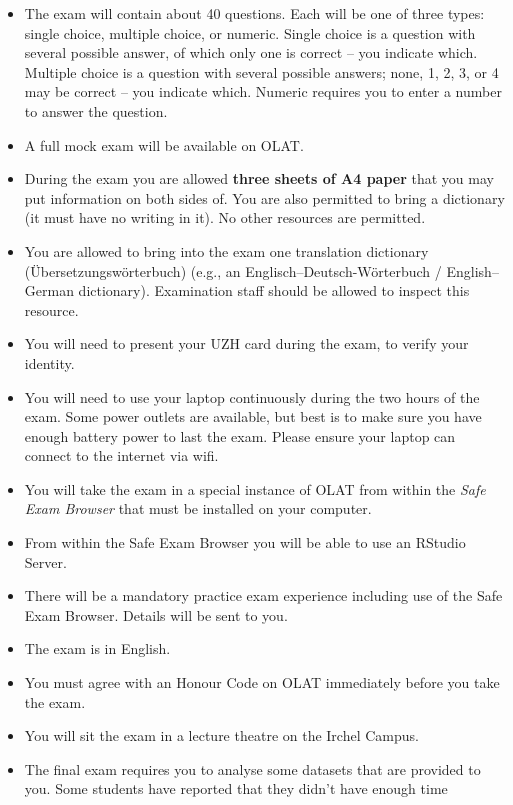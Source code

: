 \documentclass[
  letterpaper,
  8pt,
  a4paper]{book}
\providecommand{\tightlist}{%
  \setlength{\itemsep}{0pt}\setlength{\parskip}{0pt}}
\begin{document}
\begin{itemize}
\tightlist
\item
  The exam will contain about 40 questions. Each will be one of three
  types: single choice, multiple choice, or numeric. Single choice is a
  question with several possible answer, of which only one is correct --
  you indicate which. Multiple choice is a question with several
  possible answers; none, 1, 2, 3, or 4 may be correct -- you indicate
  which. Numeric requires you to enter a number to answer the question.
\item
  A full mock exam will be available on OLAT.
\item
  During the exam you are allowed \textbf{three sheets of A4 paper} that
  you may put information on both sides of. You are also permitted to
  bring a dictionary (it must have no writing in it). No other resources
  are permitted.
\item
  You are allowed to bring into the exam one translation dictionary
  (Übersetzungswörterbuch) (e.g., an Englisch--Deutsch-Wörterbuch /
  English--German dictionary). Examination staff should be allowed to
  inspect this resource.
\item
  You will need to present your UZH card during the exam, to verify your
  identity.
\item
  You will need to use your laptop continuously during the two hours of
  the exam. Some power outlets are available, but best is to make sure
  you have enough battery power to last the exam. Please ensure your
  laptop can connect to the internet via wifi.
\item
  You will take the exam in a special instance of OLAT from within the
  \emph{Safe Exam Browser} that must be installed on your computer.
\item
  From within the Safe Exam Browser you will be able to use an RStudio
  Server.
\item
  There will be a mandatory practice exam experience including use of
  the Safe Exam Browser. Details will be sent to you.
\item
  The exam is in English.
\item
  You must agree with an Honour Code on OLAT immediately before you take
  the exam.
\item
  You will sit the exam in a lecture theatre on the Irchel Campus.
\item
  The final exam requires you to analyse some datasets that are provided
  to you. Some students have reported that they didn't have enough time

\end{itemize}
\end{document}

